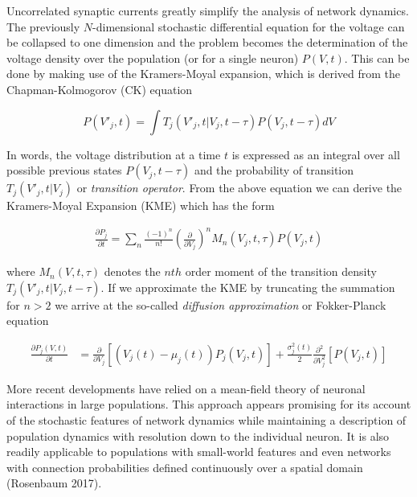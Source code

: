 \documentclass{ucetd}
\begin{document}
Uncorrelated synaptic currents greatly simplify the analysis of network dynamics. The previously $N$-dimensional stochastic differential equation for the voltage can be collapsed to one dimension and the problem becomes the determination of the voltage density over the population (or for a single neuron) $P(V,t)$. This can be done by making use of the Kramers-Moyal expansion, which is derived from the Chapman-Kolmogorov (CK) equation

\begin{equation}
P(V'_{j}, t) = \int T_{j}(V'_{j}, t | V_{j}, t-\tau)P(V_{j}, t-\tau)dV
\end{equation} 

In words, the voltage distribution at a time $t$ is expressed as an integral over all possible previous states $P(V_{j}, t-\tau)$ and the probability of transition $T_{j}(V'_{j}, t | V_{j})$ or \emph{transition operator}. From the above equation we can derive the Kramers-Moyal Expansion (KME) which has the form

\begin{align}
\frac{\partial P_{j}}{\partial t} = \sum_{n} \frac{(-1)^{n}}{n!} \left(\frac{\partial}{\partial V_{j}}\right)^{n} M_{n}(V_{j},t,\tau) P(V_{j},t)
\end{align}

where $M_{n}(V,t,\tau)$ denotes the $nth$ order moment of the transition density $T_{j}(V'_{j}, t | V_{j}, t-\tau)$. If we approximate the KME by truncating the summation for $n > 2$ we arrive at the so-called \emph{diffusion approximation} or Fokker-Planck equation

\begin{align}
\frac{\partial P_{j}(V,t)}{\partial t} &= \frac{\partial}{\partial V_{j}}[\left(V_{j}(t)-\mu_{j}(t)\right) P_{j}(V_{j},t)] + \frac{\sigma_{j}^{2}(t)}{2}\frac{\partial^{2}}{\partial V_{j}^{2}}[P(V_{j},t)]
\end{align}

More recent developments have relied on a mean-field theory of neuronal interactions in large populations. This approach appears promising for its account of the stochastic features of network dynamics while maintaining a description of population dynamics with resolution down to the individual neuron. It is also readily applicable to populations with small-world features and even networks with connection probabilities defined continuously over a spatial domain (Rosenbaum 2017).
\end{document}
